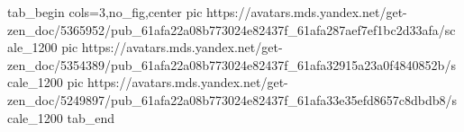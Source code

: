  
 
 
 
 


\ifcmt
  tab_begin cols=3,no_fig,center
     pic https://avatars.mds.yandex.net/get-zen_doc/5365952/pub_61afa22a08b773024e82437f_61afa287aef7ef1bc2d33afa/scale_1200
		 pic https://avatars.mds.yandex.net/get-zen_doc/5354389/pub_61afa22a08b773024e82437f_61afa32915a23a0f4840852b/scale_1200
		 pic https://avatars.mds.yandex.net/get-zen_doc/5249897/pub_61afa22a08b773024e82437f_61afa33e35efd8657c8dbdb8/scale_1200
  tab_end
\fi
